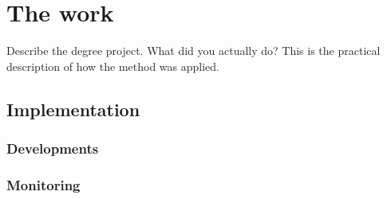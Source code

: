 \chapter{The work}

Describe the degree project. What did you actually do? This is the practical description of how the method was applied.

\section{Implementation}
\subsection{Developments}
\lipsum[1] %
\subsection{Monitoring}
\lipsum[1] %
